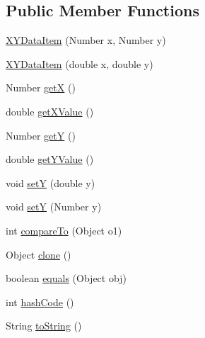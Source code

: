 \subsection*{Public Member Functions}
\begin{DoxyCompactItemize}
\item 
\mbox{\hyperlink{classorg_1_1jfree_1_1data_1_1xy_1_1_x_y_data_item_a0123d522c764962057886e90289c385b}{X\+Y\+Data\+Item}} (Number x, Number y)
\item 
\mbox{\hyperlink{classorg_1_1jfree_1_1data_1_1xy_1_1_x_y_data_item_adc42ed52fa3a237bd31faf3aad34aae0}{X\+Y\+Data\+Item}} (double x, double y)
\item 
Number \mbox{\hyperlink{classorg_1_1jfree_1_1data_1_1xy_1_1_x_y_data_item_a54ac12b01a4653c319cc72c1617ae290}{getX}} ()
\item 
double \mbox{\hyperlink{classorg_1_1jfree_1_1data_1_1xy_1_1_x_y_data_item_ae6fd536f9d38c38fbb2867c22820895b}{get\+X\+Value}} ()
\item 
Number \mbox{\hyperlink{classorg_1_1jfree_1_1data_1_1xy_1_1_x_y_data_item_a7b2d50b0cf1b16b806854e2fb74c25d9}{getY}} ()
\item 
double \mbox{\hyperlink{classorg_1_1jfree_1_1data_1_1xy_1_1_x_y_data_item_a0aa8d9e18739e51a4401f673eedd91c6}{get\+Y\+Value}} ()
\item 
void \mbox{\hyperlink{classorg_1_1jfree_1_1data_1_1xy_1_1_x_y_data_item_a0405c75813b0fa44e5a2f7bf3f31035b}{setY}} (double y)
\item 
void \mbox{\hyperlink{classorg_1_1jfree_1_1data_1_1xy_1_1_x_y_data_item_a1a3182d47320b47a63b47573a5920652}{setY}} (Number y)
\item 
int \mbox{\hyperlink{classorg_1_1jfree_1_1data_1_1xy_1_1_x_y_data_item_aea7d0b17a0a0c5129de2f79bc44507de}{compare\+To}} (Object o1)
\item 
Object \mbox{\hyperlink{classorg_1_1jfree_1_1data_1_1xy_1_1_x_y_data_item_a5e4507fc3e867b06840b17c7a8e38391}{clone}} ()
\item 
boolean \mbox{\hyperlink{classorg_1_1jfree_1_1data_1_1xy_1_1_x_y_data_item_a6b0ae7f86ce89bd062f4dd34a309d23c}{equals}} (Object obj)
\item 
int \mbox{\hyperlink{classorg_1_1jfree_1_1data_1_1xy_1_1_x_y_data_item_ac4eaf13348be48069be4b2f3e3c31fef}{hash\+Code}} ()
\item 
String \mbox{\hyperlink{classorg_1_1jfree_1_1data_1_1xy_1_1_x_y_data_item_a57c35f2a097ecba4da17bb5d5150014a}{to\+String}} ()
\end{DoxyCompactItemize}


